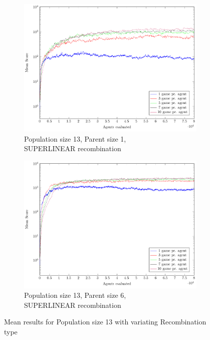 \begin{figure}
    \begin{subfigure}[b]{0.49\textwidth}
    	\caption{Population size 13, Parent size 1,\\SUPERLINEAR recombination}
        \includegraphics[width=\textwidth]{data/cma_population_offspring/13x_split/superlinear_l13_o1/mean/PlotFile.pdf}
    \end{subfigure}
    \begin{subfigure}[b]{0.49\textwidth}
    	\caption{Population size 13, Parent size 6,\\SUPERLINEAR recombination}
        \includegraphics[width=\textwidth]{data/cma_population_offspring/13x_split/superlinear_l13_o6/mean/PlotFile.pdf}
    \end{subfigure}
    
    \caption{Mean results for Population size 13 with variating Recombination type}
\end{figure}

